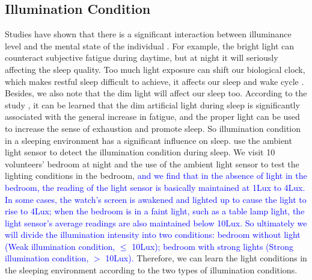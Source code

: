 \subsection{Illumination Condition \label{sec:illumination}}
Studies have shown that there is a significant interaction between illuminance level and the mental state of the individual \cite{light77}.
For example, the bright light can counteract subjective fatigue during daytime, but at night it will seriously affecting the sleep quality.
Too much light exposure can shift our biological clock, which makes restful sleep difficult to achieve, it affects our sleep and wake cycle
\cite{light2007}.  Besides, we also note that the dim light will affect our sleep too. According to the study \cite{light2016}, it can be
learned that the dim artificial light during sleep is significantly associated with the general increase in fatigue, and the proper light
can be used to increase the sense of exhaustion and promote sleep. So illumination condition in a sleeping environment has a significant
influence on sleep. {\systemname} use the ambient light sensor to detect the illumination condition during sleep. We visit 10 volunteers'
bedroom at night and the use of the ambient light sensor to test the lighting conditions in the bedroom, \textcolor{blue}{and we find that
in the absence of light in the bedroom, the reading of the light sensor is basically maintained at 1Lux to 4Lux. In some cases, the watch's
screen is awakened and lighted up to cause the light to rise to 4Lux; when the bedroom is in a faint light, such as a table lamp light, the
light sensor's average readings are also maintained below 10Lux. So ultimately we will divide the illumination intensity into two
conditions: bedroom without light (Weak illumination condition, $\leq$ 10Lux);  bedroom with strong lights (Strong illumination condition,
$>$ 10Lux).} Therefore, we can learn the light conditions in the sleeping environment according to the two types of illumination
conditions.

